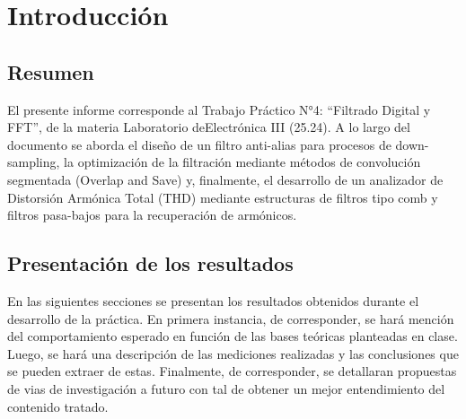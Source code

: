 \section{Introducción}

\subsection{Resumen}
El presente informe corresponde al Trabajo Práctico N°4: ``Filtrado Digital y FFT'', de la materia Laboratorio deElectrónica III (25.24). A lo largo del documento se aborda el diseño de un filtro anti-alias para procesos de down-sampling, la optimización de la filtración mediante métodos de convolución segmentada (Overlap and Save) y, finalmente, el desarrollo de un analizador de Distorsión Armónica Total (THD) mediante estructuras de filtros tipo comb y filtros pasa-bajos para la recuperación de armónicos.

\subsection{Presentación de los resultados}
En las siguientes secciones se presentan los resultados obtenidos durante el desarrollo de la práctica. En primera instancia, de corresponder, se hará mención del comportamiento esperado en función de las bases teóricas planteadas en clase. Luego, se hará una descripción de las mediciones realizadas y las conclusiones que se pueden extraer de estas. Finalmente, de corresponder, se detallaran propuestas de vias de investigación a futuro con tal de obtener un mejor entendimiento del contenido tratado.

